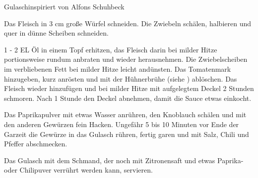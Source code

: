\begin{recipe}{Gulasch}{inspiriert von Alfons Schuhbeck}
  \label{Gulasch}
  \inglist

  \steps
  Das Fleisch in 3 cm große Würfel schneiden. Die Zwiebeln schälen, halbieren und quer in
  dünne Scheiben schneiden.

  1 - 2 EL Öl in einem Topf erhitzen, das Fleisch darin bei milder Hitze portionsweise
  rundum anbraten und wieder herausnehmen. Die Zwiebelscheiben im verbliebenen Fett bei
  milder Hitze leicht andünsten. Das Tomatenmark hinzugeben, kurz anrösten und mit der
  Hühnerbrühe (siehe \pageref{Geflügelfond}) ablöschen. Das Fleisch wieder hinzufügen und
  bei milder Hitze mit aufgelegtem Deckel 2 Stunden schmoren. Nach 1 Stunde den Deckel
  abnehmen, damit die Sauce etwas einkocht.

  Das Paprikapulver mit etwas Wasser anrühren, den Knoblauch schälen und mit den anderen
  Gewürzen fein Hacken. Ungefähr 5 bis 10 Minuten vor Ende der Garzeit die Gewürze in das
  Gulasch rühren, fertig garen und mit Salz, Chili und Pfeffer abschmecken.

  Das Gulasch mit dem Schmand, der noch mit Zitronensaft und etwas Paprika- oder
  Chilipuver verrührt werden kann, servieren.
\end{recipe}
